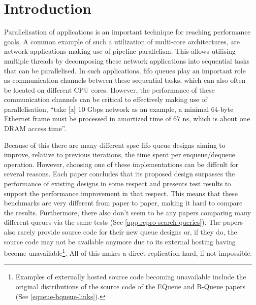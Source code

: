 \chapter{Introduction}
Parallelisation of applications is an important technique for reaching performance goals.
A common example of such a utilization of multi-core architectures, are network applications making use
of pipeline parallelism\cite{Upadhyaya2007,WangCheng2009}.
This allows utilising multiple threads by decomposing these network applications into sequential tasks that can be
parallelised\cite{WangCheng2009}.
In such applications, \acrshort{fifo} queues play an important role as communication channels between these sequential
tasks, which can also often be located on different CPU cores.
However, the performance of these communication channels can be critical to effectively making use of
parallelisation, ``take [a] 10 Gbps network as an example, a minimal 64-byte Ethernet frame must be processed
in amortized time of 67 ns, which is about one DRAM access time''\cite{B-Queue}.

Because of this there are many different \acrshort{spsc} \acrshort{fifo} queue designs aiming to improve, relative to previous
iterations, the time spent per enqueue/dequeue operation\cite{B-Queue,EQueue,FastForward,FastFlowGithub,MCRingBuffer}.
However, choosing one of these implementations can be diffcult for several reasons.
Each paper concludes that its proposed design surpasses the performance of existing designs in some
respect and presents test results to support the performance improvement in that respect.
This means that these benchmarks are very different from paper to paper, making it hard to compare the results.
Furthermore, there also don't seem to be any papers comparing many different queues via the same tests (See
\autoref{app:repro-search-queries}).
The papers also rarely provide source code for their new queue designs or, if they do, the source code may
not be available anymore due to its external hosting having become unavailable\footnote{Examples of externally
    hosted source code becoming unavailable include the original distributions of the source code of the EQueue
and B-Queue papers (See \autoref{equeue-bqueue-links}).}.
All of this makes a direct replication hard, if not impossible\cite{sep-scientific-reproducibility}.

